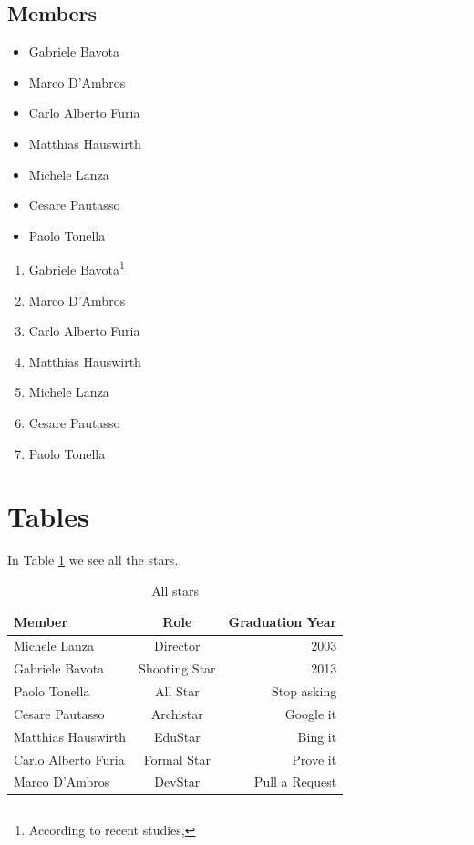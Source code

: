 \subsection{Members}

\begin{itemize}

\item Gabriele Bavota
\item Marco D'Ambros
\item Carlo Alberto Furia
\item Matthias Hauswirth
\item Michele Lanza
\item Cesare Pautasso
\item Paolo Tonella

\end{itemize}

\begin{enumerate}

\item Gabriele Bavota\footnote{According to recent studies, \lipsum[1]}
\item Marco D'Ambros
\item Carlo Alberto Furia
\item Matthias Hauswirth
\item Michele Lanza \cite{Lanz2006a}
\item Cesare Pautasso
\item Paolo Tonella

\end{enumerate}

\section{Tables}

In Table \ref{tab-allstars} we see all the stars.

\begin{table}[ht]
\centering
\begin{tabular}{lcr} \hline
{\bf Member} & {\bf Role} & {\bf Graduation Year}\\ \hline
Michele Lanza & Director & 2003\\
Gabriele Bavota & Shooting Star & 2013\\ \hline
Paolo Tonella & All Star & Stop asking\\ 
Cesare Pautasso & Archistar & Google it\\
Matthias Hauswirth & EduStar & Bing it\\
Carlo Alberto Furia & Formal Star & Prove it\\
Marco D'Ambros & DevStar & Pull a Request\\
\end{tabular}
\caption{All stars}
\label{tab-allstars}
\end{table}